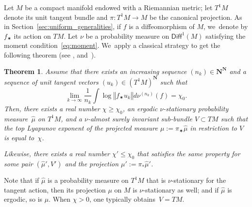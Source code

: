\documentclass[JEP,XML,SOM,Unicode,published]{cedram}
\newcommand{\norm}[1]{{\left\Vert#1\right\Vert}}
\def\N{\mathbf{N}}
\newcommand\Diff{{\mathsf{Diff}}}
\theoremstyle{plain}
\newtheorem{thm}{Theorem}[section]
\theoremstyle{definition}
\begin{document}
Let $M$ be a compact manifold endowed with a Riemannian metric; let $T^1M$ denote its unit tangent bundle
and $\pi\colon T^1M\to M$ be the canonical projection. As in Section~\ref{sec:uniform_generalities},
if $f$ is a diffeomorphism of $M$, we~denote by $f_\varstar $ its action on $TM$.
Let $\nu$ be a probability measure on $\Diff^1(M)$
satisfying the moment condition~\eqref{eq:moment}. We~apply a classical strategy to get the
following theorem (see \eg \cite[Prop.\,3.17]{chung}, and~\cite[Lem.\,3.3]{hurtado:burnside}).

\begin{thm}\label{thm:limit_measure_top_lyapunov}
Assume that there exists an increasing sequence $(n_k)\in \N^\N$ and a
sequence of unit tangent vectors $( u_k)\in (T^1M)^\N$
such that
\begin{equation*}\label{eq:exponential_dilatation}
\lim_{k\to\infty} \frac{1}{n_k} \int \log \norm{f_\varstar u_k} d\nu^{(n_k)}(f) = \chi_0.
\end{equation*}
Then, there exists a real number $\chi\geq \chi_0$, an ergodic $\nu$-stationary probability measure~$\hat{\mu}$
on $T^1M$, and a $\nu$-almost surely invariant sub-bundle $V\subset TM$ such that the top Lyapunov exponent of the projected measure $\mu:=\pi_\varstar \hat{\mu}$ in restriction to $V$ is equal to~$\chi$.

Likewise, there exists
a real number $\chi' \leq \chi_0$ that satisfies the same property for
some pair $(\hat{\mu}', V')$ and the projection $\mu':= \pi_*\hat{\mu}'$.
\end{thm}

Note that if $\hat\mu$ is a probability measure on $T^1M$ that is
$\nu$-stationary for the tangent action, then its projection $\mu $ on $M$ is $\nu$-stationary as well; and if $\hat\mu$ is ergodic, so is $\mu$.
When $\chi >0$, one typically obtains~$V=TM$.
\end{document}
